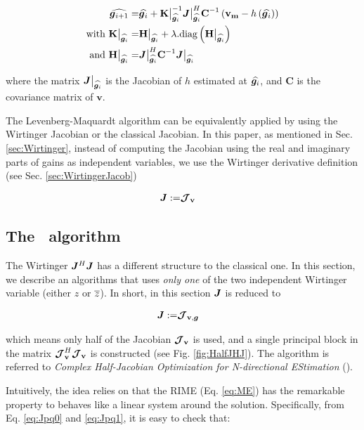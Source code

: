 \def\SimpleJacobAtXi{\bm{J}\big|_{\widehat{\g_{i}}}}
\def\HAtXi{\H\big|_{\widehat{\g_{i}}}}
\def\KAtXi{\textbf{K}\big|_{\widehat{\g_{i}}}}
\begin{alignat}{2}
\label{eq:LM}
\widehat{\vec{g}_{i+1}}=&\widehat{\vec{g}_{i}}+\KAtXi^{-1}\SimpleJacobAtXi^H\textbf{C}^{-1}\left(\mathbf{v_m}-h\left(\widehat{\vec{g}_{i}}\right)\right)\\
\text{with }\KAtXi=&\HAtXi+\lambda.\text{diag} \left(\HAtXi\right)\\
\text{and }\HAtXi=&\SimpleJacobAtXi^H\textbf{C}^{-1}\SimpleJacobAtXi
\end{alignat}

\noindent where the matrix $\SimpleJacobAtXi$ is the Jacobian of $h$
estimated at $\widehat{\bm{g}_{i}}$, and
$\textbf{C}$ is the covariance matrix of $\mathbf{v}$.

The Levenberg-Maquardt algorithm can be equivalently applied by using the Wirtinger Jacobian
or the classical Jacobian. In this paper, as mentioned in Sec. \ref{sec:Wirtinger}, instead of computing the Jacobian using the real and
imaginary parts of gains as independent variables, we use the Wirtinger
derivative definition (see Sec. \ref{sec:WirtingerJacob})

\begin{alignat}{2}
\label{eq:LMWirtinger}
\bm{J}:=&\bm{\mathcal{J}}_{\textbf{v}}
\end{alignat}

\subsection{The \COH~algorithm}
\label{sec:COH}

The Wirtinger $\bm{J}^H\bm{J}$ has a different structure to the classical one. In this section, we describe an algorithms that uses {\it only one} of the
two independent Wirtinger variable (either $z$ or $\overline{z}$). In
short, in this section $\bm{J}$ is reduced to

\begin{alignat}{2}
\label{eq:LMWirtinger}
\bm{J}:=&\bm{\mathcal{J}}_{\textbf{v},\bm{g}}
\end{alignat}

\noindent which means only half of the
Jacobian $\bm{\mathcal{J}}_{\textbf{v}}$ is used, and a single principal block in the matrix
$\bm{\mathcal{J}}_{\textbf{v}}^H\bm{\mathcal{J}}_{\textbf{v}}$ is constructed (see Fig. \ref{fig:HalfJHJ}). The algorithm is referred to {\it Complex Half-Jacobian Optimization for
N-directional EStimation} (\COH).

Intuitively, the idea relies on that the RIME (Eq. \ref{eq:ME}) has the remarkable property to
behaves like a linear system around the solution. Specifically, from Eq. \ref{eq:Jpq0} and
\ref{eq:Jpq1}, it is easy to check that:

